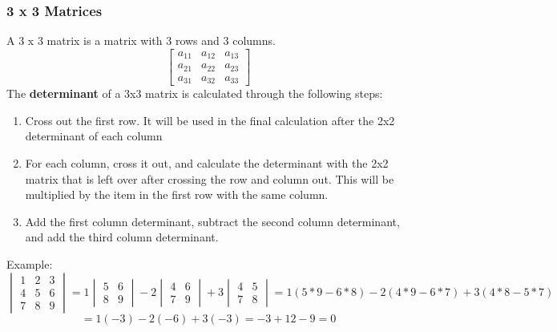 \documentclass{article}
\begin{document}
        \subsubsection{3 x 3 Matrices}
        A 3 x 3 matrix is a matrix with 3 rows and 3 columns.
        $$ \begin{bmatrix}
          a_{11} & a_{12} & a_{13} \\
          a_{21} & a_{22} & a_{23} \\
          a_{31} & a_{32} & a_{33}
          \end{bmatrix}
        $$
        The \textbf{determinant} of a 3x3 matrix is calculated through the following steps:
        \begin{enumerate}
            \item Cross out the first row. It will be used in the final calculation after the 2x2 determinant of each
              column
              \item For each column, cross it out, and calculate the determinant with the
                2x2 matrix that is left over after crossing the row and column out. This will be multiplied by the 
                item in the first row with the same column.
                \item Add the first column determinant, subtract the second column determinant, and add the third column determinant.
                  \end{enumerate}

        Example:
        $$ \begin{vmatrix}
          1 & 2 & 3 \\
          4 & 5 & 6 \\
          7 & 8 & 9
        \end{vmatrix} = 
        1\begin{vmatrix}
          5 & 6 \\
          8 & 9
        \end{vmatrix}
        - 2\begin{vmatrix}
          4 & 6 \\
          7 & 9
        \end{vmatrix}
        + 3
        \begin{vmatrix}
          4 & 5 \\
          7 & 8
        \end{vmatrix}
        = 1 (5*9-6*8) - 2(4*9 - 6*7) + 3(4*8 - 5*7)  
          $$
          $$ = 1(-3) - 2(-6) + 3(-3) = -3 + 12 - 9 = 0$$
\end{document}
